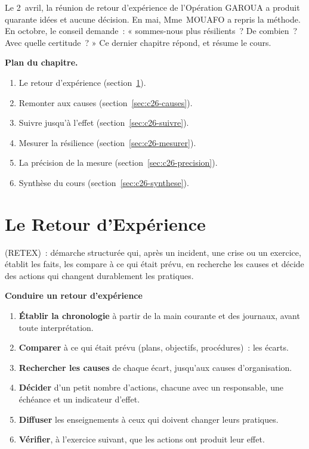 Le 2~avril, la réunion de retour d'expérience de l'Opération GAROUA a
produit quarante idées et aucune décision. En mai, Mme~MOUAFO a repris la
méthode. En octobre, le conseil demande~: « sommes-nous plus résilients~?
De combien~? Avec quelle certitude~? » Ce dernier chapitre répond, et
résume le cours.

\medskip
\textbf{Plan du chapitre.}
\begin{enumerate}
    \item Le retour d'expérience (section~\ref{sec:c26-retex}).
    \item Remonter aux causes (section~\ref{sec:c26-causes}).
    \item Suivre jusqu'à l'effet (section~\ref{sec:c26-suivre}).
    \item Mesurer la résilience (section~\ref{sec:c26-mesurer}).
    \item La précision de la mesure (section~\ref{sec:c26-precision}).
    \item Synthèse du cours (section~\ref{sec:c26-synthese}).
\end{enumerate}

\separateur

\section{Le Retour d'Expérience}
\label{sec:c26-retex}

\begin{boxdef}
 (RETEX)~: démarche structurée qui, après un
incident, une crise ou un exercice, établit les faits, les compare à ce
qui était prévu, en recherche les causes et décide des actions qui
changent durablement les pratiques.
\end{boxdef}

\begin{boxprocedure}
\textbf{Conduire un retour d'expérience}
\begin{enumerate}
    \item \textbf{Établir la chronologie} à partir de la main courante et
          des journaux, avant toute interprétation.
    \item \textbf{Comparer} à ce qui était prévu (plans, objectifs,
          procédures)~: les écarts.
    \item \textbf{Rechercher les causes} de chaque écart, jusqu'aux causes
          d'organisation.
    \item \textbf{Décider} d'un petit nombre d'actions, chacune avec un
          responsable, une échéance et un indicateur d'effet.
    \item \textbf{Diffuser} les enseignements à ceux qui doivent changer
          leurs pratiques.
    \item \textbf{Vérifier}, à l'exercice suivant, que les actions ont
          produit leur effet.
\end{enumerate}
\end{boxprocedure}


